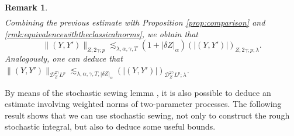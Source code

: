 \documentclass[11pt,a4paper]{article}
\theoremstyle{plain}
\newtheorem{rmk}[defn]{Remark}
\begin{document}
\begin{appendices}
\begin{rmk}
\begin{equation*}
\begin{aligned}
    \end{aligned}
    \end{equation*}
    Combining the previous estimate with Proposition \ref{prop:comparison} and \ref{rmk:equivalencewiththeclassicalnorms}, we obtain that \begin{equation*}
        \|(Y,Y')\|_{Z;2\gamma;p} \lesssim_{\lambda,\alpha,\gamma,T} (1+|\delta Z|_\alpha) (|(Y,Y')|)_{Z;2\gamma;p;\lambda}.
    \end{equation*}
    Analogously, one can deduce that $\|(Y,Y')\|_{\mathscr{D}_Z^{2\gamma}L^p} \lesssim_{\lambda,\alpha,\gamma,T,|\delta Z|_\alpha} (|(Y,Y')|)_{\mathscr{D}_Z^{2\gamma}L^p;\lambda}$.
\end{rmk}


By means of the stochastic sewing lemma \cite[Theorem 2.9]{FHL21}, it is also possible to deduce an estimate involving weighted norms of two-parameter processes. The following result shows that we can use stochastic sewing, not only to construct the rough stochastic integral, but also to deduce some useful bounds.


\end{appendices}
\end{document}
